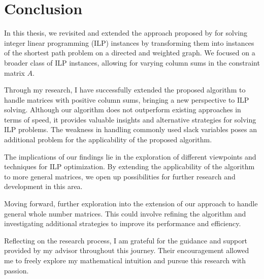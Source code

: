 \chapter{Conclusion}
In this thesis, we revisited and extended the approach proposed by \cite{algebraic_statistics} for solving integer linear programming (ILP) instances by transforming them into instances of the shortest path problem on a directed and weighted graph. We focused on a broader class of ILP instances, allowing for varying column sums in the constraint matrix $A$.

Through my research, I have successfully extended the proposed algorithm to handle matrices with positive column sums, bringing a new perspective to ILP solving. Although our algorithm does not outperform existing approaches in terms of speed, it provides valuable insights and alternative strategies for solving ILP problems. The weakness in handling commonly used slack variables poses an additional problem for the applicability of the proposed algorithm.

The implications of our findings lie in the exploration of different viewpoints and techniques for ILP optimization. By extending the applicability of the algorithm to more general matrices, we open up possibilities for further research and development in this area.

Moving forward, further exploration into the extension of our approach to handle general whole number matrices. This could involve refining the algorithm and investigating additional strategies to improve its performance and efficiency.

Reflecting on the research process, I am grateful for the guidance and support provided by my advisor throughout this journey. Their encouragement allowed me to freely explore my mathematical intuition and pursue this research with passion.

